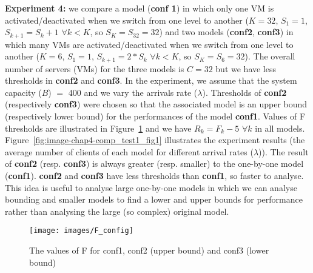 \documentclass[conference]{IEEEtran}
\begin{document}
\textbf{Experiment 4:} we compare a model (\textbf{conf 1}) in which only one VM is activated/deactivated when we switch from one level to another  ($K=32$, $S_1=1$, $S_{k+1}=S_{k}+1$ $\forall k<K$, so $S_{K}=S_{32}=32$) and two models (\textbf{conf2}, \textbf{conf3}) in which many VMs are activated/deactivated when we switch from one level to another ($K=6$, $S_1=1$, $S_{k+1}=2*S_{k}$ $\forall k<K$, so $S_{K}=S_{6}=32$). The overall number of servers (VMs) for the three models is $C=32$ but we have less thresholds in \textbf{conf2} and \textbf{conf3}. In the experiment, we assume that the system capacity ($B$) $=$ 400 and we vary the arrivals rate ($\lambda$). Thresholds of \textbf{conf2} (respectively \textbf{conf3}) were chosen so that the associated model is an upper bound (respectively lower bound) for the performances of the model \textbf{conf1}. Values of F thresholds are illustrated in Figure~\ref{fig:fconfig} and we have $R_{k}=F_{k}-5$ $\forall k$ in all models. Figure~\ref{fig:image-chap4-comp_test1_fig1} illustrates the experiment results (the average number of clients of each model for different arrival rates ($\lambda$)). The result of \textbf{conf2}  (resp. \textbf{conf3}) is always greater (resp. smaller) to the one-by-one model (\textbf{conf1}). \textbf{conf2} and \textbf{conf3} have less thresholds than \textbf{conf1}, so faster to analyse. This idea is useful to analyse large one-by-one models in which we can analyse bounding and smaller models to find a lower and upper bounds for performance rather than analysing the large (so complex) original model.

\begin{figure}[!ht]
\centering
\texttt{[image: images/F\_config]}
\caption{The values of F for conf1, conf2 (upper bound) and conf3 (lower bound)}
\label{fig:fconfig}
\end{figure}
\end{document}
